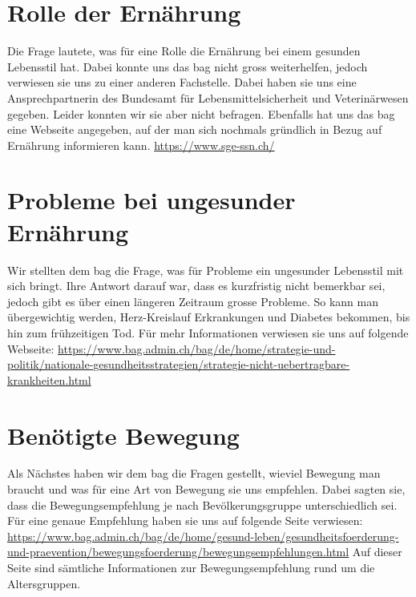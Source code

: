 \section{Rolle der Ernährung}
Die Frage lautete, was für eine Rolle die Ernährung bei einem gesunden Lebensstil hat. Dabei konnte uns das \acs{bag} nicht gross weiterhelfen, jedoch verwiesen sie uns zu einer anderen Fachstelle. Dabei haben sie uns eine Ansprechpartnerin des  Bundesamt für Lebensmittelsicherheit und Veterinärwesen gegeben. Leider konnten wir sie aber nicht befragen. Ebenfalls hat uns das \acs{bag} eine Webseite angegeben, auf der man sich nochmals gründlich in Bezug auf Ernährung informieren kann.
\newline
\url{https://www.sge-ssn.ch/}
\section{Probleme bei ungesunder Ernährung}
Wir stellten dem \acs{bag} die Frage, was für Probleme ein ungesunder Lebensstil mit sich bringt. Ihre Antwort darauf war, dass es kurzfristig nicht bemerkbar sei, jedoch gibt es über einen längeren Zeitraum grosse Probleme. So kann man übergewichtig werden, Herz-Kreislauf Erkrankungen und Diabetes bekommen, bis hin zum frühzeitigen Tod. Für mehr Informationen verwiesen sie uns auf folgende Webseite: 
\newline
\url{https://www.bag.admin.ch/bag/de/home/strategie-und-politik/nationale-gesundheitsstrategien/strategie-nicht-uebertragbare-krankheiten.html}
\section{Benötigte Bewegung}
Als Nächstes haben wir dem \acs{bag} die Fragen gestellt, wieviel Bewegung man braucht und was für eine Art von Bewegung sie uns empfehlen. Dabei sagten sie, dass die Bewegungsempfehlung je nach Bevölkerungsgruppe unterschiedlich sei. Für eine genaue Empfehlung haben sie uns auf folgende Seite verwiesen:
\newline
\url{https://www.bag.admin.ch/bag/de/home/gesund-leben/gesundheitsfoerderung-und-praevention/bewegungsfoerderung/bewegungsempfehlungen.html}
\newline
Auf dieser Seite sind sämtliche Informationen zur Bewegungsempfehlung rund um die Altersgruppen. 
